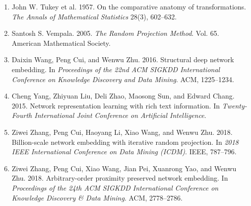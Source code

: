 \documentclass[11pt]{article}
\begin{document}
\begin{enumerate}[leftmargin=1.5em]
    \item John W. Tukey et al. 1957. On the comparative anatomy of transformations. \emph{The Annals of Mathematical Statistics} 28(3), 602--632.
    \item Santosh S. Vempala. 2005. \emph{The Random Projection Method}. Vol. 65. American Mathematical Society.
    \item Daixin Wang, Peng Cui, and Wenwu Zhu. 2016. Structural deep network embedding. In \emph{Proceedings of the 22nd ACM SIGKDD International Conference on Knowledge Discovery and Data Mining}. ACM, 1225--1234.
    \item Cheng Yang, Zhiyuan Liu, Deli Zhao, Maosong Sun, and Edward Chang. 2015. Network representation learning with rich text information. In \emph{Twenty-Fourth International Joint Conference on Artificial Intelligence}.
    \item Ziwei Zhang, Peng Cui, Haoyang Li, Xiao Wang, and Wenwu Zhu. 2018. Billion-scale network embedding with iterative random projection. In \emph{2018 IEEE International Conference on Data Mining (ICDM)}. IEEE, 787--796.
    \item Ziwei Zhang, Peng Cui, Xiao Wang, Jian Pei, Xuanrong Yao, and Wenwu Zhu. 2018. Arbitrary-order proximity preserved network embedding. In \emph{Proceedings of the 24th ACM SIGKDD International Conference on Knowledge Discovery \& Data Mining}. ACM, 2778--2786.
\end{enumerate}
\end{document}
